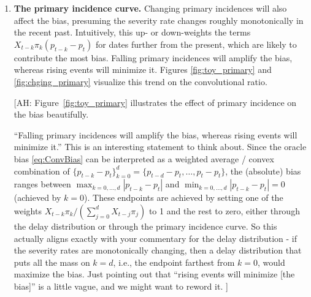 \documentclass{article}
\newcommand{\ahcomment}[1]{{\color{red}[AH: #1]}}
\begin{document}
\begin{enumerate}

\item \textbf{The primary incidence curve.} Changing primary incidences will also affect the bias, presuming the severity rate changes roughly monotonically in the recent past. Intuitively, this up- or down-weights the terms $X_{t-k}\pi_k(p_{t-k} - p_t)$ for dates further from the present, which are likely to contribute the most bias. Falling primary incidences will amplify the bias, whereas rising events will minimize it. Figures \ref{fig:toy_primary} and \ref{fig:chging_primary} visualize this trend on the convolutional ratio. %
\ahcomment{
  Figure~\ref{fig:toy_primary} illustrates the effect of primary incidence
  on the bias beautifully.  

  ``Falling primary incidences will amplify the bias, whereas rising events
  will minimize it.''  This is an interesting statement to think about.
  Since the oracle bias \eqref{eq:ConvBias} can be interpreted as a weighted
  average / convex combination of
  $\{p_{t-k}-p_t\}_{k=0}^d = \{p_{t-d} - p_t, \dotsc, p_t - p_t\}$, the
  (absolute) bias ranges between
  $\max_{k=0, \dotsc, d} |p_{t-k}-p_t|$ and
  $\min_{k=0, \dotsc, d} |p_{t-k}-p_t| = 0$ (achieved by $k=0$).  These
  endpoints are achieved by setting one of the weights
  $X_{t-k}\pi_k/(\sum_{j=0}^d X_{t-j}\pi_j)$ to 1 and the rest to zero,
  either through the delay distribution or through the primary incidence curve.
  So this actually aligns exactly with your commentary for the delay
  distribution - if the severity rates are monotonically changing, then
  a delay distribution that puts all the mass on $k=d$, i.e., the endpoint
  farthest from $k=0$, would maximize the bias.  Just pointing out that
  ``rising events will minimize [the bias]'' is a little vague, and we might
  want to reword it.
}

\end{enumerate}
\end{document}
